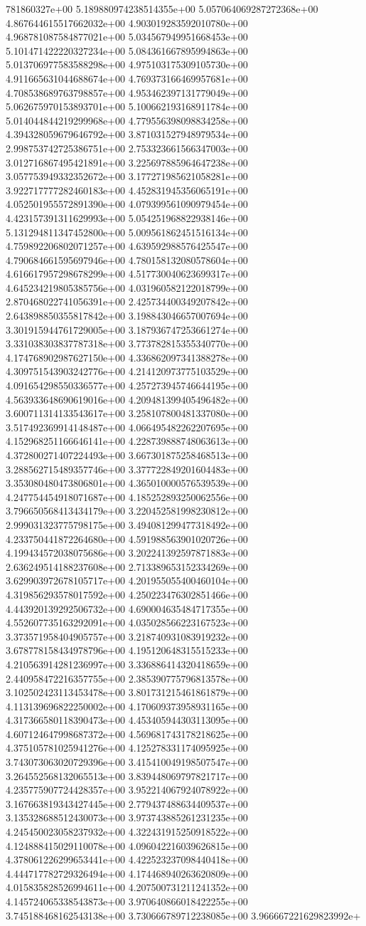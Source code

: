781860327e+00	5.189880974238514355e+00	5.057064069287272368e+00	4.867644615517662032e+00	4.903019283592010780e+00	4.968781087584877021e+00	5.034567949951668453e+00	5.101471422220327234e+00	5.084361667895994863e+00	5.013706977583588298e+00	4.975103175309105730e+00	4.911665631044688674e+00	4.769373166469957681e+00	4.708538689763798857e+00	4.953462397131779049e+00	5.062675970153893701e+00	5.100662193168911784e+00	5.014044844219299968e+00	4.779556398098834258e+00	4.394328059679646792e+00	3.871031527948979534e+00	2.998753742725386751e+00	2.753323661566347003e+00	3.012716867495421891e+00	3.225697885964647238e+00	3.057753949332352672e+00	3.177271985621058281e+00	3.922717777282460183e+00	4.452831945356065191e+00	4.052501955572891390e+00	4.079399561090979454e+00	4.423157391311629993e+00	5.054251968822938146e+00	5.131294811347452800e+00	5.009561862451516134e+00	4.759892206802071257e+00	4.639592988576425547e+00	4.790684661595697946e+00	4.780158132080578604e+00	4.616617957298678299e+00	4.517730040623699317e+00	4.645234219805385756e+00	4.031960582122018799e+00	2.870468022741056391e+00	2.425734400349207842e+00	2.643898850355817842e+00	3.198843046657007694e+00	3.301915944761729005e+00	3.187936747253661274e+00	3.331038303837787318e+00	3.773782815355340770e+00	4.174768902987627150e+00	4.336862097341388278e+00	4.309751543903242776e+00	4.214120973775103529e+00	4.091654298550336577e+00	4.257273945746644195e+00	4.563933648690619016e+00	4.209481399405496482e+00	3.600711314133543617e+00	3.258107800481337080e+00	3.517492369914148487e+00	4.066495482262207695e+00	4.152968251166646141e+00	4.228739888748063613e+00	4.372800271407224493e+00	3.667301875258468513e+00	3.288562715489357746e+00	3.377722849201604483e+00	3.353080480473806801e+00	4.365010000576539539e+00	4.247754454918071687e+00	4.185252893250062556e+00	3.796650568413434179e+00	3.220452581998230812e+00	2.999031323775798175e+00	3.494081299477318492e+00	4.233750441872264680e+00	4.591988563901020726e+00	4.199434572038075686e+00	3.202241392597871883e+00	2.636249514188237608e+00	2.713389653152334269e+00	3.629903972678105717e+00	4.201955055400460104e+00	4.319856293578017592e+00	4.250223476302851466e+00	4.443920139292506732e+00	4.690004635484717355e+00	4.552607735163292091e+00	4.035028566223167523e+00	3.373571958404905757e+00	3.218740931083919232e+00	3.678778158434978796e+00	4.195120648315515233e+00	4.210563914281236997e+00	3.336886414320418659e+00	2.440958472216357755e+00	2.385390775796813578e+00	3.102502423113453478e+00	3.801731215461861879e+00	4.113139696822250002e+00	4.170609373958931165e+00	4.317366580118390473e+00	4.453405944303113095e+00	4.607124647998687372e+00	4.569681743178218625e+00	4.375105781025941276e+00	4.125278331174095925e+00	3.743073063020729396e+00	3.415410049198507547e+00	3.264552568132065513e+00	3.839448069797821717e+00	4.235775907724428357e+00	3.952214067924078922e+00	3.167663819343427445e+00	2.779437488634409537e+00	3.135328688512430073e+00	3.973743885261231235e+00	4.245450023058237932e+00	4.322431915250918522e+00	4.124888415029110078e+00	4.096042216039626815e+00	4.378061226299653441e+00	4.422523237098440418e+00	4.444717782729326494e+00	4.174468940263620809e+00	4.015835828526994611e+00	4.207500731211241352e+00	4.145724065338543873e+00	3.970640866018422255e+00	3.745188468162543138e+00	3.730666789712238085e+00	3.966667221629823992e+